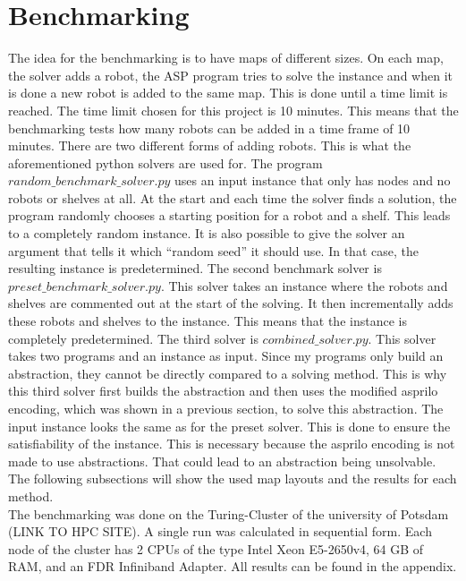 \documentclass[runningheads]{llncs}
\begin{document}
\section{Benchmarking}
The idea for the benchmarking is to have maps of different sizes. On each map, the solver adds a robot, the ASP program tries to solve the instance and when it is done a new robot is added to the same map. This is done until a time limit is reached. The time limit chosen for this project is 10 minutes. This means that the benchmarking tests how many robots can be added in a time frame of 10 minutes. There are two different forms of adding robots. This is what the aforementioned python solvers are used for. The program $random\_benchmark\_solver.py$ uses an input instance that only has nodes and no robots or shelves at all. At the start and each time the solver finds a solution, the program randomly chooses a starting position for a robot and a shelf. This leads to a completely random instance. It is also possible to give the solver an argument that tells it which ``random seed'' it should use. In that case, the resulting instance is predetermined. The second benchmark solver is $preset\_benchmark\_solver.py$. This solver takes an instance where the robots and shelves are commented out at the start of the solving. It then incrementally adds these robots and shelves to the instance. This means that the instance is completely predetermined. The third solver is $combined\_solver.py$. This solver takes two programs and an instance as input. Since my programs only build an abstraction, they cannot be directly compared to a solving method. This is why this third solver first builds the abstraction and then uses the modified asprilo encoding, which was shown in a previous section, to solve this abstraction. The input instance looks the same as for the preset solver. This is done to ensure the satisfiability of the instance. This is necessary because the asprilo encoding is not made to use abstractions. That could lead to an abstraction being unsolvable. The following subsections will show the used map layouts and the results for each method. \\
The benchmarking was done on the Turing-Cluster of the university of Potsdam (LINK TO HPC SITE). A single run was calculated in sequential form. Each node of the cluster has 2 CPUs of the type Intel Xeon E5-2650v4, 64 GB of RAM, and an FDR Infiniband Adapter. All results can be found in the appendix.
\end{document}

